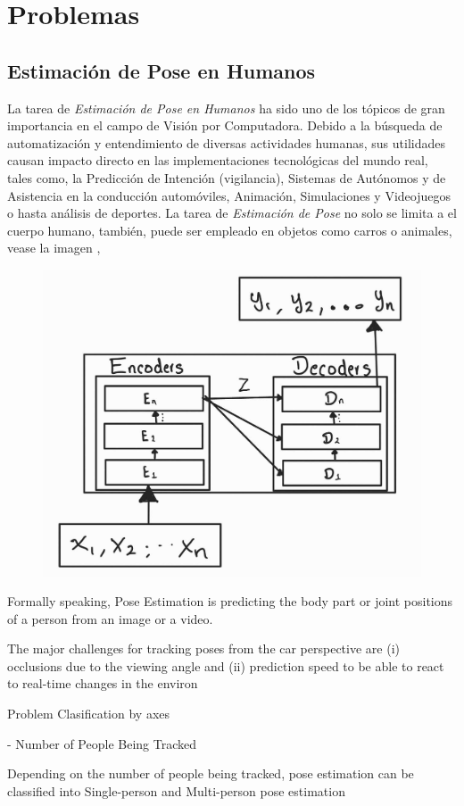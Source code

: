 \section{Problemas}

\subsection{Estimación de Pose en Humanos}

La tarea de \textit{Estimación de Pose en Humanos} ha sido uno de los tópicos de gran importancia en
el campo de Visión por Computadora. Debido a la búsqueda de automatización y entendimiento de
diversas actividades humanas, sus utilidades causan impacto directo en las implementaciones
tecnológicas del mundo real, tales como, la Predicción de Intención (vigilancia), Sistemas de
Autónomos y de Asistencia en la conducción automóviles, Animación, Simulaciones y Videojuegos
o hasta análisis de deportes. La tarea de \textit{Estimación de Pose} no solo se limita a el cuerpo
humano, también, puede ser empleado en objetos como carros o animales, vease la imagen ,


\begin{figure}[ht!]
    \centering
    \includegraphics[width=0.4 \textwidth]{Chapters/2. Transformer/Figures/transformer/t_seq2seq.jpg}
    \caption{\cite{DBLP:journals/corr/abs-2103-02440}}
    \label{fig:trans_seq2sqe}
\end{figure}



Formally speaking, Pose Estimation is predicting the body part or joint positions of a person from
an image or a video.

The major challenges for tracking poses from the car perspective are
(i) occlusions due to the viewing angle and (ii) prediction
speed to be able to react to real-time changes in the environ

Problem Clasification by axes


- Number of People Being Tracked

Depending on the number of people being tracked, pose estimation can be classified into
Single-person and Multi-person pose estimation

